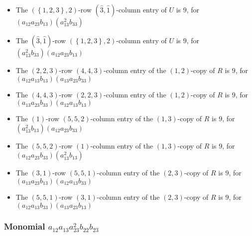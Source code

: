 \documentclass{article}
\begin{document}
\begin{itemize}
\item The $ \left(\left\{1, 2, 3\right\}, 2\right) $-row $ (\hat{3}, \hat{1}) $-column entry of $U$ is $ 9 $, for $( a_{12} a_{23} b_{13} )( a_{13}^{2} b_{33} )$ 
\item The $(\hat{3}, \hat{1})$-row $ \left(\left\{1, 2, 3\right\}, 2\right) $-column entry of $U$ is $ 9 $, for $( a_{13}^{2} b_{33} )( a_{12} a_{23} b_{13} )$ 
\item The $(2, 2, 3)$-row $(4, 4, 3)$-column entry of the $ \left(1, 2\right) $-copy of $R$ is $ 9 $, for $( a_{12} a_{13} b_{13} )( a_{13} a_{23} b_{33} )$ 
\item The $(4, 4, 3)$-row $(2, 2, 3)$-column entry of the $ \left(1, 2\right) $-copy of $R$ is $ 9 $, for $( a_{13} a_{23} b_{33} )( a_{12} a_{13} b_{13} )$ 
\item The $(1)$-row $(5, 5, 2)$-column entry of the $ \left(1, 3\right) $-copy of $R$ is $ 9 $, for $( a_{13}^{2} b_{13} )( a_{12} a_{23} b_{33} )$ 
\item The $(5, 5, 2)$-row $(1)$-column entry of the $ \left(1, 3\right) $-copy of $R$ is $ 9 $, for $( a_{12} a_{23} b_{33} )( a_{13}^{2} b_{13} )$ 
\item The $(3, 1)$-row $(5, 5, 1)$-column entry of the $ \left(2, 3\right) $-copy of $R$ is $ 9 $, for $( a_{13} a_{23} b_{13} )( a_{12} a_{13} b_{33} )$ 
\item The $(5, 5, 1)$-row $(3, 1)$-column entry of the $ \left(2, 3\right) $-copy of $R$ is $ 9 $, for $( a_{12} a_{13} b_{33} )( a_{13} a_{23} b_{13} )$ 
\end{itemize}
\subsubsection{Monomial $ a_{12} a_{13} a_{23}^{2} b_{22} b_{23} $}
\end{document}
